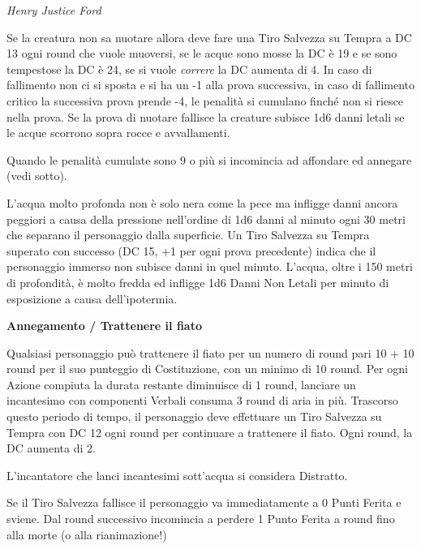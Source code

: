 \begin{multicols}{2}
\begin{center}
	\emph{Henry Justice Ford}\end{center}

\medskip


Se la creatura non sa nuotare allora deve fare una Tiro Salvezza su Tempra a DC 13 ogni round che vuole muoversi, se le acque sono mosse la DC è 19 e se sono tempestose la DC è 24, se si vuole \emph{correre} la DC aumenta di 4.
In caso di fallimento non ci si sposta e si ha un -1 alla prova successiva, in caso di fallimento critico la successiva prova prende -4, le penalità si cumulano finché non si riesce nella prova.
Se la prova di nuotare fallisce la creature subisce 1d6 danni letali se le acque scorrono sopra rocce e avvallamenti.

Quando le penalità cumulate sono 9 o più si incomincia ad affondare ed annegare (vedi sotto).

L'acqua molto profonda non è solo nera come la pece ma infligge danni ancora peggiori a causa della pressione nell'ordine di 1d6 danni al minuto ogni 30 metri che separano il personaggio dalla superficie. Un Tiro Salvezza su Tempra superato con successo (DC 15, +1 per ogni prova precedente) indica che il personaggio immerso non subisce danni in quel minuto. L'acqua, oltre i 150 metri di profondità, è molto fredda ed infligge 1d6 Danni Non Letali per minuto di esposizione a causa dell'ipotermia.

\medskip

\textbf{Annegamento / Trattenere il fiato}\hypertarget{trattenereilfiato}{}\label{trattenereilfiato}

\medskip

Qualsiasi personaggio può trattenere il fiato per un numero di round pari 10 + 10 round per il suo punteggio di Costituzione, con un minimo di 10 round. Per ogni Azione compiuta la durata restante diminuisce di 1 round, lanciare un incantesimo con componenti Verbali consuma 3 round di aria in più. Trascorso questo periodo di tempo, il personaggio deve effettuare un Tiro Salvezza su Tempra con DC 12 ogni round per continuare a trattenere il fiato. Ogni round, la DC aumenta di 2.

L'incantatore che lanci incantesimi sott'acqua si considera Distratto.

Se il Tiro Salvezza fallisce il personaggio va immediatamente a 0 Punti Ferita e sviene. Dal round successivo incomincia a perdere 1 Punto Ferita a round fino alla morte (o alla rianimazione!)


\end{multicols}
